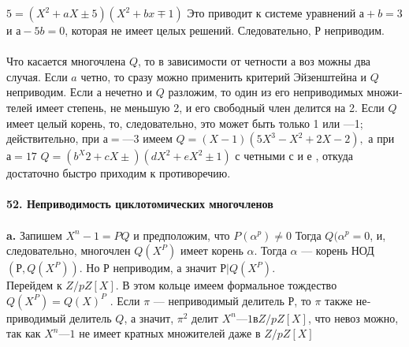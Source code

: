 $5 = (X^{2} + aX \pm 5)(X^{2} + bx \mp 1)$ Это приводит к системе уравнений \linebreak
$а + b = 3$ и $а - 5b = 0$, которая не имеет целых решений. Следовательно,\linebreak
$Р$ неприводим.\\
\\
\hspace*{15pt} Что касается многочлена $Q$, то в зависимости от четности а воз­
можны два случая. Если $a$ четно, то сразу можно применить критерий
Эйзенштейна и $Q$ неприводим.
\hspace*{0pt} Если а нечетно и $Q$ разложим, то один из его неприводимых множи­\linebreak
телей имеет степень, не меньшую 2, и его свободный член делится на 2.\linebreak
Если $Q$ имеет целый корень, то, следовательно, это может быть только 1\linebreak
или —1; действительно, при $а = —3$ имеем $Q = (X - 1)(5X^3 - X^2 + 2X - 2),$\linebreak
а при $а = 17$ $Q = (b^X{2} + cX \pm)(dX^{2} + eX^{2} \pm 1)$ с четными $с$ и $е$ , откуда\linebreak
достаточно быстро приходим к противоречию.\\
\\
\noindent\textbf{52. Неприводимость циклотомических многочленов}\\
\\
\hspace*{15pt}\textbf{a.} Запишем $X^{n} - 1 = PQ $ и предположим, что $P(\alpha^p) \neq 0$ Тогда\linebreak
$Q(\alpha^{p} = 0$, и, следовательно, многочлен $Q(X^{P})$ имеет корень $\alpha$. Тогда\linebreak
$\alpha$ ---  корень НОД$(Р, Q(X^{P}))$. Но $Р$ неприводим, а значит $Р | Q(X^{P})$.\\
\hspace*{0pt}Перейдем к $Z/pZ[X]$. В этом кольце имеем формальное тождество\linebreak
$Q(X^{P}) = Q(X)^{P}$ . Если $\pi$ --- неприводимый делитель $Р$, то $\pi$ также не­\linebreak
приводимый делитель $Q$, а значит, $\pi^{2}$ делит $X^{n} — 1 в Z/pZ[X]$, что невоз­\linebreak
можно, так как $X^{n} — 1$ не имеет кратных множителей даже в $Z/pZ[X]$\\
\newpage
